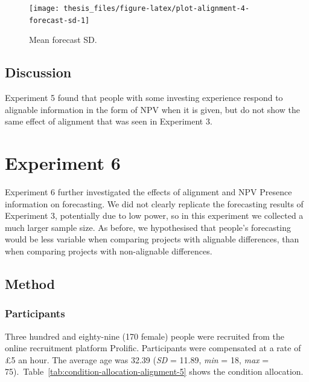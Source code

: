 \documentclass[a4paper, nobind, dvipsnames]{templates/ociamthesis}
\theoremstyle{definition}
\theoremstyle{definition}
\theoremstyle{definition}
\theoremstyle{definition}
\theoremstyle{remark}
\begin{document}
\begin{figure}
\texttt{[image: thesis\_files/figure-latex/plot-alignment-4-forecast-sd-1]} \caption{Mean forecast SD.}\label{fig:plot-alignment-4-forecast-sd}
\end{figure}

\hypertarget{discussion-12}{%
\subsection{Discussion}\label{discussion-12}}

Experiment 5 found that people with some investing experience respond to
alignable information in the form of NPV when it is given, but do not show the
same effect of alignment that was seen in Experiment 3.

\hypertarget{experiment-6}{%
\section{Experiment 6}\label{experiment-6}}

Experiment 6 further investigated the effects of alignment and NPV Presence
information on forecasting. We did not clearly replicate the forecasting results
of Experiment 3, potentially due to low power, so in this experiment we
collected a much larger sample size. As before, we hypothesised that people's
forecasting would be less variable when comparing projects with alignable
differences, than when comparing projects with non-alignable differences.

\hypertarget{method-14}{%
\subsection{Method}\label{method-14}}

\hypertarget{participants-14}{%
\subsubsection{Participants}\label{participants-14}}

Three hundred and eighty-nine (170 female) people were recruited from the online recruitment platform Prolific. Participants were compensated at a rate of £5 an hour. The average age was 32.39 (\emph{SD} = 11.89, \emph{min} = 18, \emph{max} = 75).~Table~\ref{tab:condition-allocation-alignment-5}
shows the condition allocation.
\end{document}
